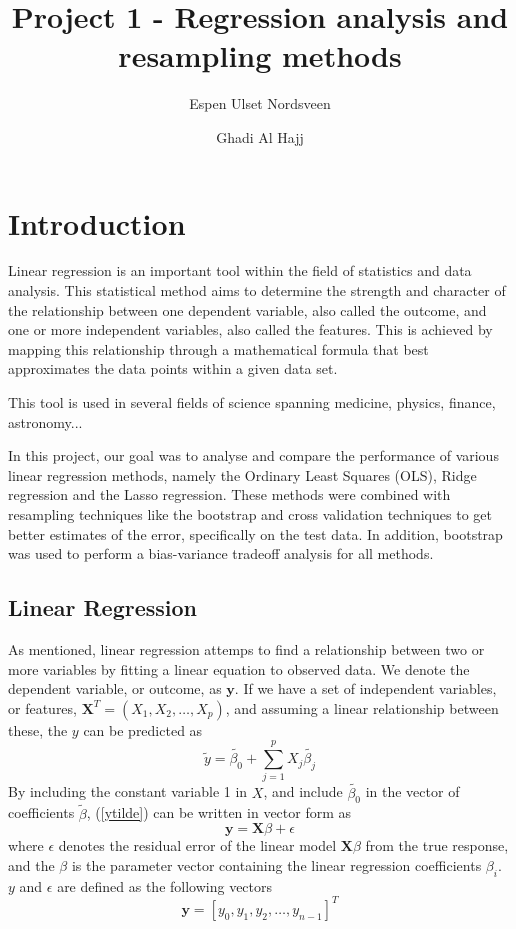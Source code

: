 \documentclass{article}
\title{Project 1 - Regression analysis and resampling methods}
\author{Espen Ulset Nordsveen
\and Ghadi Al Hajj}
\begin{document}
\maketitle
\section{Introduction}
Linear regression is an important tool within the field of statistics and data analysis. This statistical method aims to determine the strength and character of the relationship between one dependent variable, also called the outcome, and one or more independent variables, also called the features. This is achieved by mapping this relationship through a mathematical formula that best approximates the data points within a given data set.

This tool is used in several fields of science spanning medicine, physics, finance, astronomy...

In this project, our goal was to analyse and compare the performance of various linear regression methods, namely the Ordinary Least Squares (OLS), Ridge regression and the Lasso regression. These methods were combined with resampling techniques like the bootstrap and cross validation techniques to get better estimates of the error, specifically on the test data. In addition, bootstrap was used to perform a bias-variance tradeoff analysis for all methods.

\subsection{Linear Regression}
As mentioned, linear regression attemps to find a relationship between two or more variables by fitting a linear equation to observed data. We denote the dependent variable, or outcome, as $\textbf{y}$. If we have a set of independent variables, or features, $\textbf{X}^{T} = (X_{1}, X_{2}, \dots, X_{p})$, and assuming a linear relationship between these, the $y$ can be predicted as
\begin{equation} \label{ytilde}
\tilde{y} = \tilde{\beta_{0}} + \sum_{j=1}^{p} X_{j} \tilde{\beta_{j}}
\end{equation}
By including the constant variable 1 in $X$, and include $\tilde{\beta_{0}}$ in the vector of coefficients $\tilde{\beta}$,  (\ref{ytilde}) can be written in vector form as
\begin{equation}\label{matrixform}
\textbf{y} = \textbf{X} \beta + \epsilon
\end{equation}
where $\epsilon$ denotes the residual error of the linear model $\textbf{X}\beta$ from the true response, and the $\beta$ is the parameter vector containing the linear regression coefficients $\beta_{i}$. $y$ and $\epsilon$ are defined as the following vectors
\begin{equation}
\textbf{y} = [y_{0}, y_{1}, y_{2}, \dots, y_{n-1}]^{T}
\end{equation}
\end{document}
